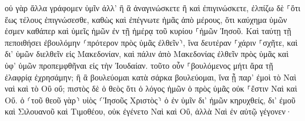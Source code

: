 \documentclass{openreader}
\begin{document}
οὐ γὰρ ἄλλα γράφομεν ὑμῖν ἀλλ’ ἢ ἃ ἀναγινώσκετε ἢ καὶ ἐπιγινώσκετε, ἐλπίζω δὲ ⸀ὅτι ἕως τέλους ἐπιγνώσεσθε, 
καθὼς καὶ ἐπέγνωτε ἡμᾶς ἀπὸ μέρους, ὅτι καύχημα ὑμῶν ἐσμεν καθάπερ καὶ ὑμεῖς ἡμῶν ἐν τῇ ἡμέρᾳ τοῦ κυρίου ⸀ἡμῶν Ἰησοῦ. 
Καὶ ταύτῃ τῇ πεποιθήσει ἐβουλόμην ⸂πρότερον πρὸς ὑμᾶς ἐλθεῖν⸃, ἵνα δευτέραν ⸀χάριν ⸀σχῆτε, 
καὶ δι’ ὑμῶν διελθεῖν εἰς Μακεδονίαν, καὶ πάλιν ἀπὸ Μακεδονίας ἐλθεῖν πρὸς ὑμᾶς καὶ ὑφ’ ὑμῶν προπεμφθῆναι εἰς τὴν Ἰουδαίαν. 
τοῦτο οὖν ⸀βουλόμενος μήτι ἄρα τῇ ἐλαφρίᾳ ἐχρησάμην; ἢ ἃ βουλεύομαι κατὰ σάρκα βουλεύομαι, ἵνα ᾖ παρ’ ἐμοὶ τὸ Ναὶ ναὶ καὶ τὸ Οὒ οὔ; 
πιστὸς δὲ ὁ θεὸς ὅτι ὁ λόγος ἡμῶν ὁ πρὸς ὑμᾶς οὐκ ⸀ἔστιν Ναὶ καὶ Οὔ. 
ὁ ⸂τοῦ θεοῦ γὰρ⸃ υἱὸς ⸂Ἰησοῦς Χριστὸς⸃ ὁ ἐν ὑμῖν δι’ ἡμῶν κηρυχθείς, δι’ ἐμοῦ καὶ Σιλουανοῦ καὶ Τιμοθέου, οὐκ ἐγένετο Ναὶ καὶ Οὒ, ἀλλὰ Ναὶ ἐν αὐτῷ γέγονεν· 
\end{document}
